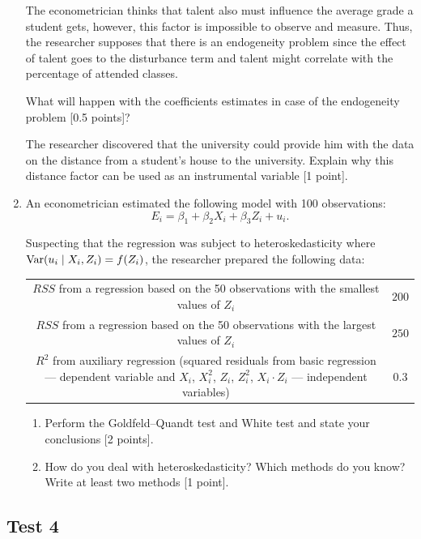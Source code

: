 \begin{enumerate}
The econometrician thinks that talent also must influence the average grade a student gets,
however, this factor is impossible to observe and measure. Thus, the researcher supposes that there
is an endogeneity problem since the effect of talent goes to the disturbance term and talent might
correlate with the percentage of attended classes.

What will happen with the coefficients estimates in case of the endogeneity problem [0.5 points]?

The researcher discovered that the university could provide him with the data on the distance from
a student's house to the university. Explain why this distance factor can be used as an instrumental
variable [1 point].

\item An econometrician estimated the following model with 100 observations:
\[
E_i = \beta_1 + \beta_2 X_i + \beta_3 Z_i + u_i.    
\]

Suspecting that the regression was subject to heteroskedasticity where $\operatorname{Var}(u_i \mid X_i, Z_i) = f(Z_i)$, 
the researcher prepared the following data:


\begin{tabular}{@{}cc@{}}
    \toprule
    $RSS$ from a regression based on the 50 observations with the smallest values of $Z_i$ & $200$ \\ 
    $RSS$ from a regression based on the 50 observations with the largest values of $Z_i$ & $250$ \\
    $R^2$ from auxiliary regression (squared residuals from basic regression — dependent variable 
    and $X_i$, $X^2_i$, $Z_i$, $Z^2_i$, $X_i \cdot Z_i$ — independent variables) & 0.3 \\
    \bottomrule
\end{tabular}
    
\begin{enumerate}
\item Perform the Goldfeld–Quandt test and White test and state your conclusions [2 points].
\item How do you deal with heteroskedasticity? Which methods do you know? Write at least two methods [1 point].
\end{enumerate}

\end{enumerate}

\subsection{Test 4}

